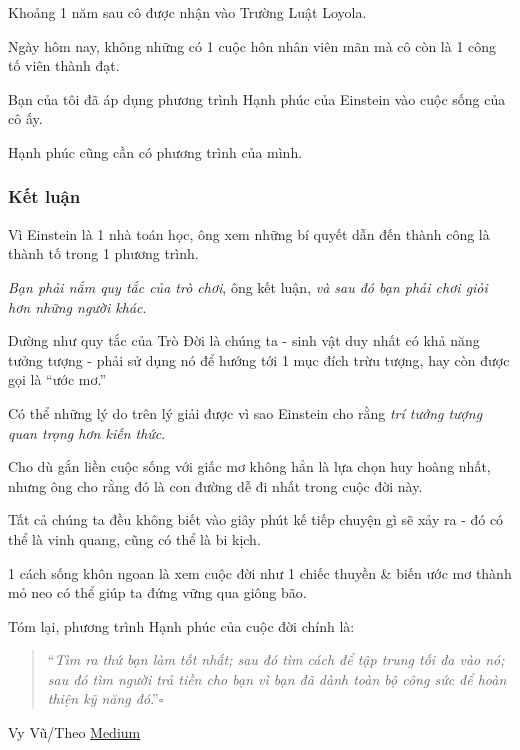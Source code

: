 \documentclass{article}
\begin{document}
Khoảng 1 năm sau cô được nhận vào Trường Luật Loyola.

%
Ngày hôm nay, không những có 1 cuộc hôn nhân viên mãn mà cô còn là 1 công tố viên thành đạt.

Bạn của tôi đã áp dụng phương trình Hạnh phúc của Einstein vào cuộc sống của cô ấy.

\textsf{Hạnh phúc cũng cần có phương trình của mình.}

\subsubsection{Kết luận}
Vì Einstein là 1 nhà toán học, ông xem những bí quyết dẫn đến thành công là thành tố trong 1 phương trình.

\textit{Bạn phải nắm quy tắc của trò chơi}, ông kết luận, \textit{và sau đó bạn phải chơi giỏi hơn những người khác}.

%
Dường như quy tắc của Trò Đời là chúng ta - sinh vật duy nhất có khả năng tưởng tượng - phải sử dụng nó để hướng tới 1 mục đích trừu tượng, hay còn được gọi là ``ước mơ.''

%
Có thể những lý do trên lý giải được vì sao Einstein cho rằng \textit{trí tưởng tượng quan trọng hơn kiến thức}.

Cho dù gắn liền cuộc sống với giấc mơ không hẳn là lựa chọn huy hoàng nhất, nhưng ông cho rằng đó là con đường dễ đi nhất trong cuộc đời này.

%
Tất cả chúng ta đều không biết vào giây phút kế tiếp chuyện gì sẽ xảy ra - đó có thể là vinh quang, cũng có thể là bi kịch.

1 cách sống khôn ngoan là xem cuộc đời như 1 chiếc thuyền \& biến ước mơ thành mỏ neo có thể giúp ta đứng vững qua giông bão.

%
Tóm lại, phương trình Hạnh phúc của cuộc đời chính là:
\begin{quotation}
	``\textit{Tìm ra thứ bạn làm tốt nhất; sau đó tìm cách để tập trung tối đa vào nó; sau đó tìm người trả tiền cho bạn vì bạn đã dành toàn bộ công sức để hoàn thiện kỹ năng đó}.''\hfill$\square$
\end{quotation}

\begin{flushright}
	Vy Vũ/Theo \href{https://medium.com/mind-cafe/einsteins-formula-for-a-happy-life-b29aff61a9c7}{Medium}
\end{flushright}

\end{document}
